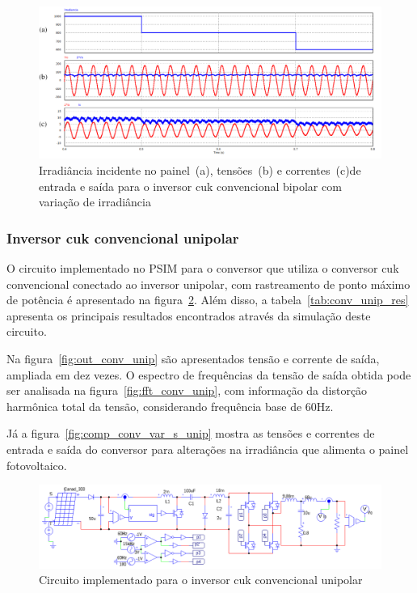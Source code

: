 \documentclass[
	12pt,				%
	openany,
	onseside,
	a4paper,			%
	english,			%
	french,				%
	spanish,			%
	brazil,				%
	]{abntex2}
\begin{document}
\begin{figure}[H]%
	\captionsetup{justification=centering}
	\centering
		\includegraphics[width= \linewidth]{comp_conv_var_s}
		\caption{Irradiância incidente no painel~(a), tensões~(b) e correntes~(c)de entrada e saída para o inversor cuk convencional bipolar com variação de irradiância}
		\label{fig:comp_conv_var_s_bip}
\end{figure}

\subsubsection{Inversor cuk convencional unipolar}

O circuito implementado no PSIM para o conversor que utiliza o conversor cuk convencional conectado ao inversor unipolar, com rastreamento de ponto máximo de potência é apresentado na figura~\ref{fig:comp_conv_circ_clean_unip}. Além disso, a tabela~\ref{tab:conv_unip_res} apresenta os principais resultados encontrados através da simulação deste circuito.

Na figura~\ref{fig:out_conv_unip} são apresentados tensão e corrente de saída, ampliada em dez vezes. O espectro de frequências da tensão de saída obtida pode ser analisada na figura~\ref{fig:fft_conv_unip},  com informação da distorção harmônica total da tensão, considerando frequência base de 60Hz.


Já a figura~\ref{fig:comp_conv_var_s_unip} mostra as tensões e correntes de entrada e saída do conversor para alterações na irradiância que alimenta o painel fotovoltaico.

\begin{figure}[H]%
	\captionsetup{justification=centering}
	\centering
		\includegraphics[width= \linewidth]{comp_conv_circ_clean_unip}
		\caption{Circuito implementado para o inversor cuk convencional unipolar}
		\label{fig:comp_conv_circ_clean_unip}
\end{figure}
\end{document}
